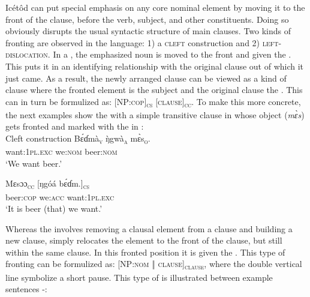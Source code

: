 Icétôd can put special emphasis on any core nominal element by moving it to the front of the clause, before the verb, subject, and other constituents. Doing so obviously disrupts the usual syntactic structure of main clauses. Two kinds of fronting are observed in the language: 1) a \textsc{cleft} construction and 2) \textsc{left-dislocation}. In a , the emphasized noun is moved to the front and given the . This puts it in an identifying relationship with the original clause out of which it just came. As a result, the newly arranged clause can be viewed as a kind of  clause where the fronted element is the  subject and the original clause the  . This can in turn be formulized as: [NP:\textsc{cop}]\textsc{\textsubscript{cs}}\textsc{ [clause]}\textsc{\textsubscript{cc}}. To make this more concrete, the next examples show the  with a simple transitive clause in  whose object (\textit{m\`{ɛ}s}) gets fronted and marked with the  in :\\ 




Cleft construction
\ea\label{ex:syn:31}
\gll B\'{ɛ}ɗ{\Í}mà\textsc{\textsubscript{v}}    {\`{ŋ}gwà}\textsc{\textsubscript{a}}    m\`{ɛ}s\textsc{\textsubscript{o}}. \\
want:\textsc{1pl.exc}   we:\textsc{nom}  beer:\textsc{nom}    \\
\glt ‘We want beer.’ 
\z




\ea\label{ex:syn:32}
\gll Mɛsɔɔ\textsc{\textsubscript{cc}}     [ŋgóá    b\'{ɛ}ɗ{\Í}m.]\textsc{\textsubscript{cs}} \\
beer:\textsc{cop}    we:\textsc{acc}   want:\textsc{1pl.exc}    \\   
\glt ‘It is beer (that) we want.’ 
\z


Whereas the  involves removing a clausal element from a clause and building a new clause,  simply relocates the element to the front of the clause, but still within the same clause. In this fronted position it is given the . This type of fronting can be formulized as: [NP:\textsc{nom} \textsc{‖}\textsc{ clause]}\textsc{\textsubscript{clause}}, where the double vertical line symbolize a short pause. This type of  is illustrated between example sentences -:\\




